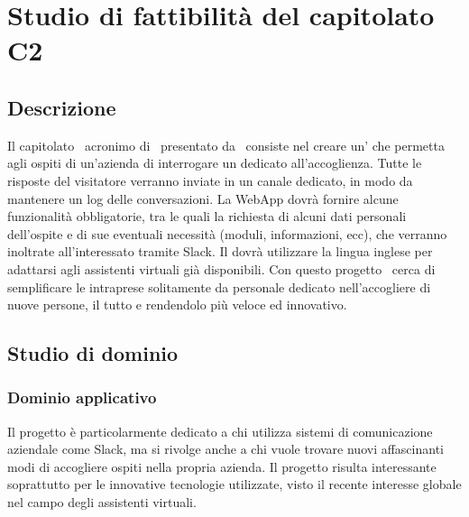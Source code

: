 \documentclass[../StudioDiFattibilita.tex]{subfiles}
\begin{document}
\section{Studio di fattibilità del capitolato C2}
	\subsection{Descrizione}
	Il capitolato \atavi\, acronimo di \acratavi\, presentato da \prop\, consiste nel creare un' che permetta agli ospiti di un'azienda di interrogare un  dedicato all'accoglienza. Tutte le risposte del visitatore verranno inviate in un canale  dedicato, in modo da mantenere un log delle conversazioni. La WebApp dovrà fornire alcune funzionalità obbligatorie, tra le quali la richiesta di alcuni dati personali dell'ospite e di sue eventuali necessità (moduli, informazioni, ecc), che verranno inoltrate all'interessato tramite Slack. Il  dovrà utilizzare la lingua inglese per adattarsi agli assistenti virtuali già disponibili. Con questo progetto \prop\ cerca di semplificare le  intraprese solitamente da personale dedicato nell'accogliere di nuove persone,  il tutto e rendendolo più veloce ed innovativo.

	\subsection{Studio di dominio}
	  	\subsubsection{Dominio applicativo}
		Il progetto è particolarmente dedicato a chi utilizza sistemi di comunicazione aziendale come Slack, ma si rivolge anche a chi vuole trovare nuovi affascinanti modi di accogliere ospiti nella propria azienda. Il progetto risulta interessante soprattutto per le innovative tecnologie utilizzate, visto il recente interesse globale nel campo degli assistenti virtuali.
\end{document}
